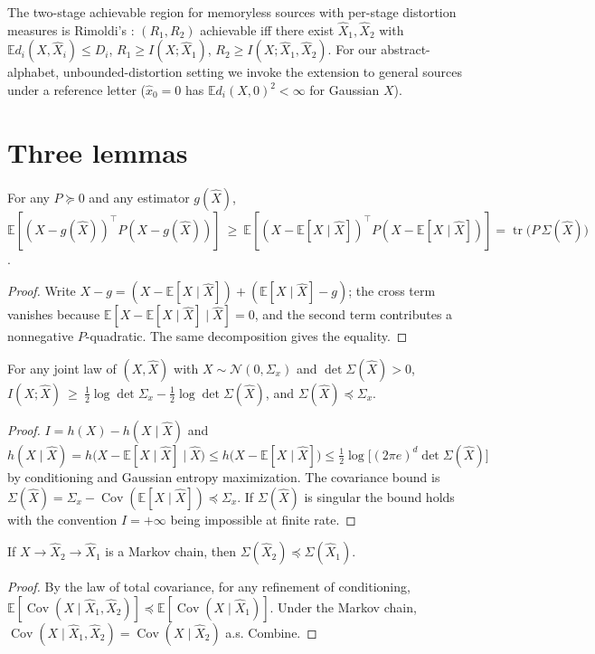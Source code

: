 \documentclass[11pt]{article}
\newcommand{\E}{\mathbb{E}}\newcommand{\tr}{\operatorname{tr}}
\newcommand{\Cov}{\operatorname{Cov}}
\begin{document}
The two-stage achievable region for memoryless sources with per-stage
distortion measures is Rimoldi's \cite{rimoldi}: $(R_1,R_2)$ achievable iff
there exist $\hat X_1,\hat X_2$ with $\E d_i(X,\hat X_i)\le D_i$,
$R_1\ge I(X;\hat X_1)$, $R_2\ge I(X;\hat X_1,\hat X_2)$. For our
abstract-alphabet, unbounded-distortion setting we invoke the extension to
general sources \cite{effros,kostinatuncel} under a reference letter
($\hat x_0=0$ has $\E d_i(X,0)^2<\infty$ for Gaussian $X$).

\section{Three lemmas}
\begin{lemma}\label{lem:cm}
For any $P\succeq0$ and any estimator $g(\hat X)$,
$\E[(X-g(\hat X))^\top P(X-g(\hat X))]\ \ge\
\E[(X-\E[X\mid\hat X])^\top P(X-\E[X\mid\hat X])]=\tr\!\bigl(P\,\Sigma(\hat X)\bigr)$.
\end{lemma}
\begin{proof}
Write $X-g=(X-\E[X\mid\hat X])+(\E[X\mid\hat X]-g)$; the cross term vanishes
because $\E[X-\E[X\mid\hat X]\mid\hat X]=0$, and the second term contributes
a nonnegative $P$-quadratic. The same decomposition gives the equality.
\end{proof}

\begin{lemma}\label{lem:info}
For any joint law of $(X,\hat X)$ with $X\sim\mathcal N(0,\Sigma_x)$ and
$\det\Sigma(\hat X)>0$,
$I(X;\hat X)\ \ge\ \tfrac12\log\det\Sigma_x-\tfrac12\log\det\Sigma(\hat X)$,
and $\Sigma(\hat X)\preceq\Sigma_x$.
\end{lemma}
\begin{proof}
$I=h(X)-h(X\mid\hat X)$ and
$h(X\mid\hat X)=h\bigl(X-\E[X\mid\hat X]\mid\hat X\bigr)
\le h\bigl(X-\E[X\mid\hat X]\bigr)
\le\tfrac12\log\bigl[(2\pi e)^d\det\Sigma(\hat X)\bigr]$
by conditioning and Gaussian entropy maximization. The covariance bound is
$\Sigma(\hat X)=\Sigma_x-\Cov(\E[X\mid\hat X])\preceq\Sigma_x$. If
$\Sigma(\hat X)$ is singular the bound holds with the convention
$I=+\infty$ being impossible at finite rate.
\end{proof}

\begin{lemma}\label{lem:markov}
If $X\to\hat X_2\to\hat X_1$ is a Markov chain, then
$\Sigma(\hat X_2)\preceq\Sigma(\hat X_1)$.
\end{lemma}
\begin{proof}
By the law of total covariance, for any refinement of conditioning,
$\E[\Cov(X\mid\hat X_1,\hat X_2)]\preceq\E[\Cov(X\mid\hat X_1)]$. Under the
Markov chain, $\Cov(X\mid\hat X_1,\hat X_2)=\Cov(X\mid\hat X_2)$ a.s.
Combine.
\end{proof}
\end{document}
